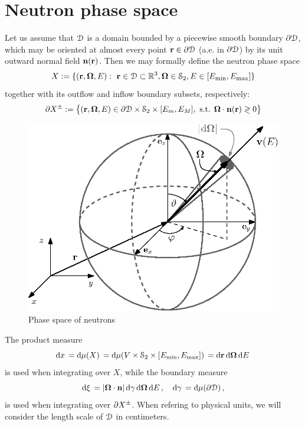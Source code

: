 \section{Neutron phase space} \label{sec:phase}
Let us assume that $\VV$ is a domain bounded by a piecewise smooth boundary $\pV$, which may be oriented at almost every
point $\br\in\pV$ (a.e. in $\pV$) by its unit outward normal field $\bn(\br)$. 
Then we may formally define the neutron phase space 
$$
  X := \{(\br,\bomega,E):\ \br\in \VV\subset\R[3], \bomega\in \Sphere, E \in [\Emin,\Emax]\}
$$
together with its outflow and inflow boundary subsets, respectively:
$$
  \pX[\pm] := \bigl\{ (\br,\bomega,E) \in \pV \times \Sphere \times [E_m, E_M], \mbox{ s.t. } \bomega\cdot\bn(\br)
  \gtrless 0 \bigr\}
$$%
\begin{figure}[!hbt]
    \centering
    \includegraphics[scale=1]{phase_space.eps}
    \caption[Phase space of neutrons]{Phase space of neutrons}
    \label{fig:phase_space}
\end{figure}%
The product measure
\begin{equation}\label{eq:measure}
  \d{x} = \d{\mu(X)} = \d{\mu(V\times\Sphere\times [\Emin,\Emax])} = \d{\br}\d{\bomega}\d{E}
\end{equation}
is used when integrating over $X$, 
while the boundary measure
\begin{equation}\label{eq:measure2}
\db = \abs{\bomega\cdot\bn}\d{\gamma}\d{\bomega}\d{E},\quad \d{\gamma} = \d{\mu(\pV)},
\end{equation}
is used when integrating over $\pX[\pm]$. When refering to physical units, we will consider the length scale of $\VV$ in
centimeters.


